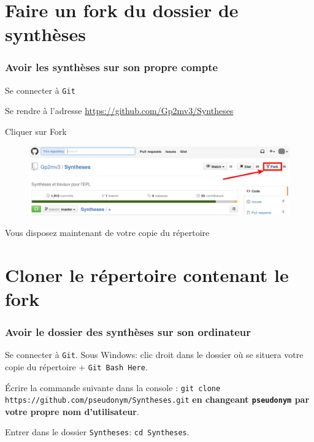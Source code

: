 \documentclass{beamer}
\newenvironment{wideitemize}{\itemize\addtolength{\itemsep}{10pt}}{\enditemize}
\begin{document}
\section{Faire un fork du dossier de synthèses}
\label{fork}

\begin{frame}
	\frametitle{Avoir les synthèses sur son propre compte}
		\begin{wideitemize}
			\item Se connecter à \lstinline|Git|
			\pause
			\item Se rendre à l'adresse
                \url{https://github.com/Gp2mv3/Syntheses}
			\pause
			\item Cliquer sur Fork
                \begin{figure}[H]
                    \centering
                    \includegraphics[width=\linewidth]{fork.png}
                \end{figure}
			\pause
			\item Vous disposez maintenant de votre copie du répertoire
		\end{wideitemize}
\end{frame}

\section{Cloner le répertoire contenant le fork}
\label{clone_fork}

\begin{frame}[fragile]
    \frametitle{Avoir le dossier des synthèses sur son ordinateur}
    \begin{wideitemize}
        \item Se connecter à \lstinline|Git|. Sous Windows: clic droit dans le dossier où se situera votre copie du répertoire + \lstinline|Git Bash Here|.
        \pause
        \item Écrire la commande suivante dans la console :
            \lstinline[mathescape]|git clone https://github.com/pseudonym/Syntheses.git| \textbf{en changeant \lstinline|pseudonym| par votre propre nom d'utilisateur}.
        \pause
        \item Entrer dans le dossier \lstinline|Syntheses|: \lstinline[mathescape]|cd Syntheses|.
    \end{wideitemize}
\end{frame}
\end{document}
